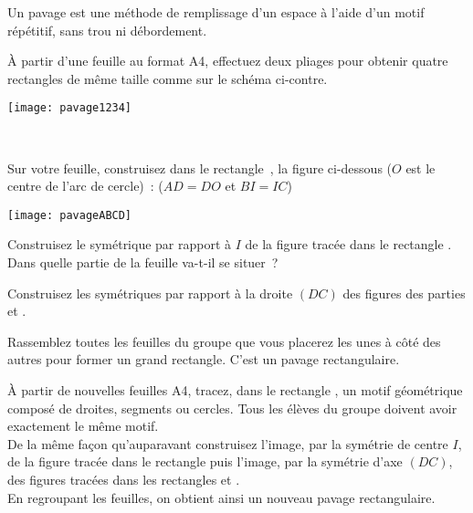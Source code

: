 \begin{TP}

Un pavage est une méthode de remplissage d'un espace à l'aide d'un motif répétitif, sans trou ni débordement.

\begin{enumerate}
\begin{minipage}[c]{0.58\linewidth}
 \item À partir d'une feuille au format A4, effectuez deux pliages pour obtenir quatre rectangles de même taille comme sur le schéma ci-contre.
 \end{minipage} \hfill%
 \begin{minipage}[c]{0.38\linewidth}
 \texttt{[image: pavage1234]}
  \end{minipage} \\
 \item Sur votre feuille, construisez dans le rectangle , la figure ci-dessous ($O$ est le centre de l'arc de cercle) : ($AD = DO$ et $BI = IC$)
 \begin{center} \texttt{[image: pavageABCD]} \end{center}
 \item Construisez le symétrique par rapport à $I$ de la figure tracée dans le rectangle . Dans quelle partie de la feuille va-t-il se situer ?
 \item Construisez les symétriques par rapport à la droite $(DC)$ des figures des parties  et .
 \end{enumerate}
Rassemblez toutes les feuilles du groupe que vous placerez les unes à côté des autres pour former un grand rectangle. C'est un pavage rectangulaire.

À partir de nouvelles feuilles A4, tracez, dans le rectangle  , un motif géométrique composé de droites, segments ou cercles. Tous les élèves du groupe doivent avoir exactement le même motif. \\[0.5em]
De la même façon qu'auparavant construisez l'image, par la symétrie de centre $I$, de la figure tracée dans le rectangle  puis l'image, par la symétrie d'axe $(DC)$, des figures tracées dans les rectangles  et . \\[0.5em]
En regroupant les feuilles, on obtient ainsi un nouveau pavage rectangulaire.
\end{TP}

